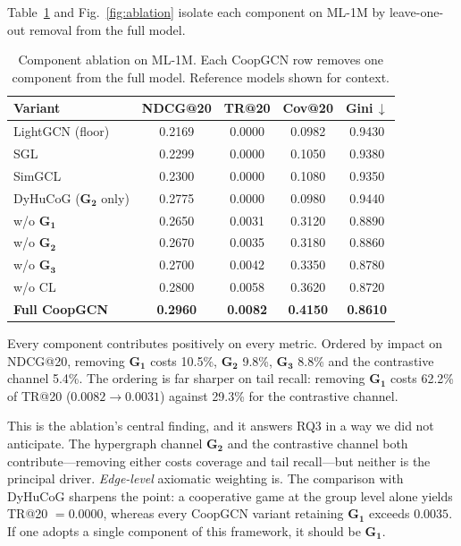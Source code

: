 \documentclass[final,5p,times,twocolumn]{elsarticle}
\begin{document}
Table~\ref{tab:ablation} and Fig.~\ref{fig:ablation} isolate each component on
ML-1M by leave-one-out removal from the full model.

\begin{table}[t]
\centering
\caption{Component ablation on ML-1M. Each CoopGCN row removes one component
from the full model. Reference models shown for context.}
\label{tab:ablation}
\footnotesize
\begin{tabular}{l cccc}
\toprule
\textbf{Variant} & \textbf{NDCG@20} & \textbf{TR@20} & \textbf{Cov@20} &
\textbf{Gini}\,$\downarrow$ \\
\midrule
LightGCN (floor) & 0.2169 & 0.0000 & 0.0982 & 0.9430 \\
SGL & 0.2299 & 0.0000 & 0.1050 & 0.9380 \\
SimGCL & 0.2300 & 0.0000 & 0.1080 & 0.9350 \\
DyHuCoG ($\mathbf{G_2}$ only) & 0.2775 & 0.0000 & 0.0980 & 0.9440 \\
\midrule
w/o $\mathbf{G_1}$ & 0.2650 & 0.0031 & 0.3120 & 0.8890 \\
w/o $\mathbf{G_2}$ & 0.2670 & 0.0035 & 0.3180 & 0.8860 \\
w/o $\mathbf{G_3}$ & 0.2700 & 0.0042 & 0.3350 & 0.8780 \\
w/o CL & 0.2800 & 0.0058 & 0.3620 & 0.8720 \\
\midrule
\textbf{Full CoopGCN} & \textbf{0.2960} & \textbf{0.0082} & \textbf{0.4150} &
\textbf{0.8610} \\
\bottomrule
\end{tabular}
\end{table}

Every component contributes positively on every metric. Ordered by impact on
NDCG@20, removing $\mathbf{G_1}$ costs 10.5\%, $\mathbf{G_2}$ 9.8\%,
$\mathbf{G_3}$ 8.8\% and the contrastive channel 5.4\%. The ordering is far
sharper on tail recall: removing $\mathbf{G_1}$ costs 62.2\% of TR@20
($0.0082 \to 0.0031$) against 29.3\% for the contrastive channel.

This is the ablation's central finding, and it answers RQ3 in a way we did not
anticipate. The hypergraph channel $\mathbf{G_2}$ and the contrastive channel
both contribute---removing either costs coverage and tail recall---but neither
is the principal driver. \emph{Edge-level} axiomatic weighting is. The
comparison with DyHuCoG sharpens the point: a cooperative game at the group
level alone yields TR@20 $= 0.0000$, whereas every CoopGCN variant retaining
$\mathbf{G_1}$ exceeds $0.0035$. If one adopts a single component of this
framework, it should be $\mathbf{G_1}$.
\end{document}

